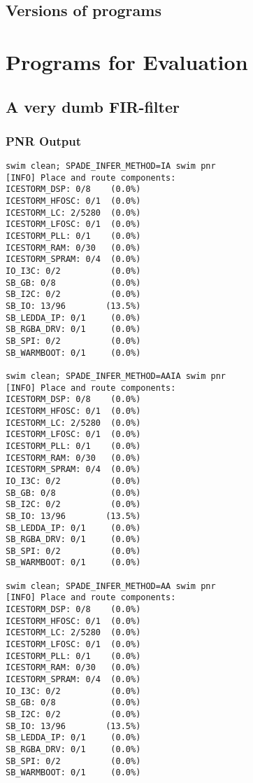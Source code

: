 \documentclass[msc,lith,english]{liuthesis}
\begin{document}
\section{Versions of programs}

\chapter{Programs for Evaluation}
\label{app:Programs}

\section{A very dumb FIR-filter}

\subsection{PNR Output}
\begin{verbatim}
swim clean; SPADE_INFER_METHOD=IA swim pnr
[INFO] Place and route components:
ICESTORM_DSP: 0/8    (0.0%)
ICESTORM_HFOSC: 0/1  (0.0%)
ICESTORM_LC: 2/5280  (0.0%)
ICESTORM_LFOSC: 0/1  (0.0%)
ICESTORM_PLL: 0/1    (0.0%)
ICESTORM_RAM: 0/30   (0.0%)
ICESTORM_SPRAM: 0/4  (0.0%)
IO_I3C: 0/2          (0.0%)
SB_GB: 0/8           (0.0%)
SB_I2C: 0/2          (0.0%)
SB_IO: 13/96        (13.5%)
SB_LEDDA_IP: 0/1     (0.0%)
SB_RGBA_DRV: 0/1     (0.0%)
SB_SPI: 0/2          (0.0%)
SB_WARMBOOT: 0/1     (0.0%)

swim clean; SPADE_INFER_METHOD=AAIA swim pnr
[INFO] Place and route components:
ICESTORM_DSP: 0/8    (0.0%)
ICESTORM_HFOSC: 0/1  (0.0%)
ICESTORM_LC: 2/5280  (0.0%)
ICESTORM_LFOSC: 0/1  (0.0%)
ICESTORM_PLL: 0/1    (0.0%)
ICESTORM_RAM: 0/30   (0.0%)
ICESTORM_SPRAM: 0/4  (0.0%)
IO_I3C: 0/2          (0.0%)
SB_GB: 0/8           (0.0%)
SB_I2C: 0/2          (0.0%)
SB_IO: 13/96        (13.5%)
SB_LEDDA_IP: 0/1     (0.0%)
SB_RGBA_DRV: 0/1     (0.0%)
SB_SPI: 0/2          (0.0%)
SB_WARMBOOT: 0/1     (0.0%)

swim clean; SPADE_INFER_METHOD=AA swim pnr
[INFO] Place and route components:
ICESTORM_DSP: 0/8    (0.0%)
ICESTORM_HFOSC: 0/1  (0.0%)
ICESTORM_LC: 2/5280  (0.0%)
ICESTORM_LFOSC: 0/1  (0.0%)
ICESTORM_PLL: 0/1    (0.0%)
ICESTORM_RAM: 0/30   (0.0%)
ICESTORM_SPRAM: 0/4  (0.0%)
IO_I3C: 0/2          (0.0%)
SB_GB: 0/8           (0.0%)
SB_I2C: 0/2          (0.0%)
SB_IO: 13/96        (13.5%)
SB_LEDDA_IP: 0/1     (0.0%)
SB_RGBA_DRV: 0/1     (0.0%)
SB_SPI: 0/2          (0.0%)
SB_WARMBOOT: 0/1     (0.0%)
\end{verbatim}
\end{document}

